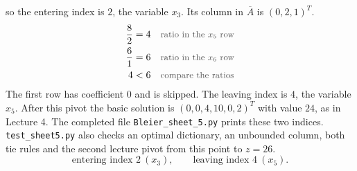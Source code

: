 \documentclass[a4paper,11pt]{article}
\newif\ifexplain
\newcommand{\why}[1]{\text{\small\color{black!65}#1}}
\newcommand{\explain}[1]{\ifexplain\begin{erklbox}#1\end{erklbox}\fi}
\begin{document}
so the entering index is $2$, the variable $x_3$. Its column in $\overline A$ is $(0,2,1)^T$.
\begin{align*}
\frac{8}{2}&=4&&\why{ratio in the $x_5$ row}\\
\frac{6}{1}&=6&&\why{ratio in the $x_6$ row}\\
4&<6&&\why{compare the ratios}
\end{align*}
The first row has coefficient $0$ and is skipped. The leaving index is $4$, the variable $x_5$. After this pivot the basic solution is $(0,0,4,10,0,2)^T$ with value $24$, as in Lecture 4. The completed file \texttt{Bleier\_sheet\_5.py} prints these two indices. \texttt{test\_sheet5.py} also checks an optimal dictionary, an unbounded column, both tie rules and the second lecture pivot from this point to $z=26$.
\[\boxed{\text{entering index }2\ (x_3),\qquad \text{leaving index }4\ (x_5).}\]
\explain{Im Dictionary steht das Minus vor $\overline A$, nicht in der gespeicherten Matrix. Der Quotiententest teilt deshalb $\overline b$ durch die positive Spalte von $\overline A$. Wer das Vorzeichen in die Matrix zieht, sucht die austretende Variable in der falschen Spalte. Die Indizes in Python sind um eins kleiner als die Variablennummern aus der Vorlesung. Eins weniger.}

\explain{Classroom task 5.1, nur als Lernzusatz. Der Startpunkt ist eine zulässige Basislösung, also ein Dictionary mit $\overline b\geq 0$. In der Schleife berechnen wir die reduzierten Kosten $\overline c_N=c_N-\overline A^T c_B$. Die gewünschte Eigenschaft ist $\overline c_N\leq 0$: keine Nichtbasisvariable kann die Zielfunktion noch erhöhen. Dann ist die aktuelle Basislösung optimal und wir stoppen. Sonst wählen wir eine Nichtbasisvariable mit positiver reduzierter Kosten. Die austretende Variable liefert der Quotiententest. Hat die Spalte keinen positiven Eintrag, ist das LP unbeschränkt. Gibt es beide Indizes, tauschen wir sie und schreiben das Dictionary neu. Dann von vorn. Das ist genau der Ablauf aus den beiden Läufen in Aufgabe 5.1 und aus dem Test von Example 2.2, nur ohne die konkreten Zahlen dieses Blatts.}
\end{document}
